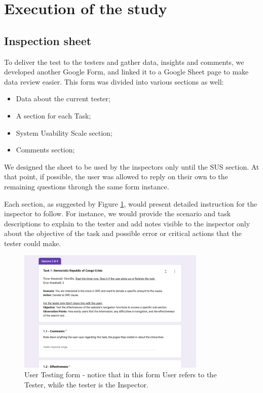 \section{Execution of the study}
\subsection{Inspection sheet}
To deliver the test to the testers and gather data, insights and comments, we developed another Google Form, and linked it to a Google Sheet page to make data review easier. This form was divided into various sections as well:
\begin{itemize}
	\item Data about the current tester;
	\item A section for each Task;
	\item System Usability Scale section;
	\item Comments section;
\end{itemize}
We designed the sheet to be used by the inspectors only until the SUS section. At that point, if possible, the user was allowed to reply on their own to the remaining questions through the same form instance.

Each section, as suggested by Figure \ref{fig:testing_form}, would present detailed instruction for the inspector to follow. For instance, we would provide the scenario and task descriptions to explain to the tester and add notes visible to the inspector only about the objective of the task and possible error or critical actions that the tester could make.

\begin{figure}[h]
	\centering
	\includegraphics[width=0.8\textwidth]{img/testing_form.png}
	\caption{User Testing form - notice that in this form User refers to the Tester, while the tester is the Inspector.}
	\label{fig:testing_form}
\end{figure}

